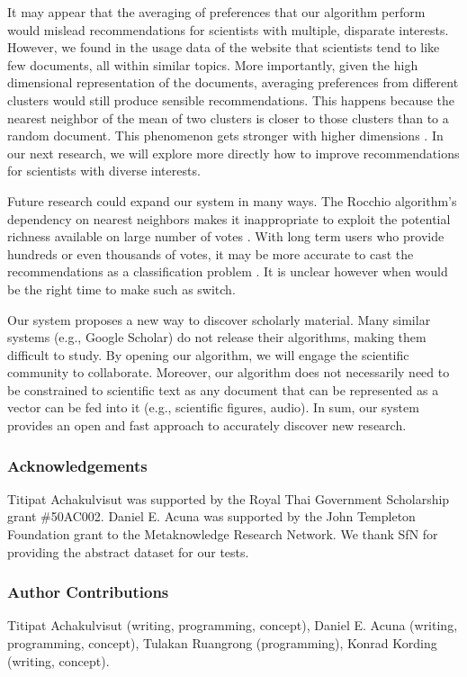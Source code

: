 \documentclass[a4paper]{article}
\begin{document}
It may appear that the averaging of preferences that our
algorithm perform would mislead recommendations for scientists with
multiple, disparate interests. However, we found in the usage data
of the website that scientists tend to like few documents,
all within similar topics. More importantly, given the high
dimensional representation of the documents, averaging preferences
from different clusters would still produce sensible recommendations.
This happens because the nearest neighbor of the mean of two clusters is closer to those clusters than to a random document.
This phenomenon gets stronger with higher dimensions  \cite{hopcroftfoundations}. In our next research, we will explore more directly how to improve recommendations for scientists with diverse interests.

Future research could expand our system in many ways. The Rocchio algorithm’s dependency on nearest neighbors makes it inappropriate to exploit the potential richness available on large number of votes \cite{friedman2001elements}. With long term users who provide hundreds or even thousands of votes, it may be more accurate to cast the recommendations as a classification problem \cite{lavrenko2001relevance}. It is unclear however when would be the right time to make such as switch.

Our system proposes a new way to discover scholarly material. Many similar systems (e.g., Google Scholar) do not release their algorithms, making them difficult to study. By opening our algorithm, we will engage the scientific community to collaborate. Moreover, our algorithm does not necessarily need to be constrained to scientific text as any document that can be represented as a vector can be fed into it (e.g., scientific figures, audio). In sum, our system provides an open and fast approach to accurately discover new research.


\subsubsection*{Acknowledgements}

Titipat Achakulvisut was supported by the Royal Thai Government Scholarship grant \#50AC002. Daniel E. Acuna was supported by the John Templeton Foundation grant to the Metaknowledge Research Network. We thank SfN for providing the abstract dataset for our tests.

\subsubsection*{Author Contributions}

Titipat Achakulvisut (writing, programming, concept), Daniel E. Acuna (writing, programming, concept), Tulakan Ruangrong (programming), Konrad Kording (writing, concept).

{}

\end{document}
